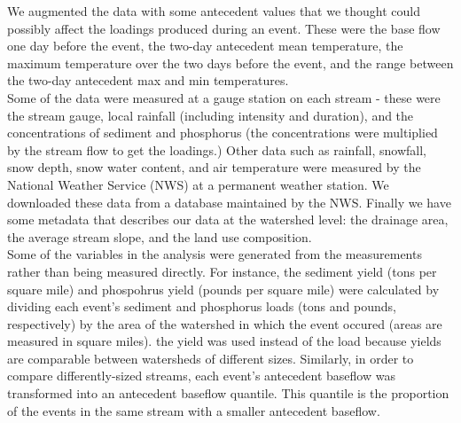 \documentclass[10pt]{article}
\begin{document}
We augmented the data with some antecedent values that we thought could possibly affect the loadings produced during an event. These were the base flow one day before the event, the two-day antecedent mean temperature, the maximum temperature over the two days before the event, and the range between the two-day antecedent max and min temperatures.\\

Some of the data were measured at a gauge station on each stream - these were the stream gauge, local rainfall (including intensity and duration), and the concentrations of sediment and phosphorus (the concentrations were multiplied by the stream flow to get the loadings.) Other data such as rainfall, snowfall, snow depth, snow water content, and air temperature were measured by the National Weather Service (NWS) at a permanent weather station. We downloaded these data from a database maintained by the NWS. Finally we have some metadata that describes our data at the watershed level: the drainage area, the average stream slope, and the land use composition.\\

Some of the variables in the analysis were generated from the measurements rather than being measured directly. For instance, the sediment yield (tons per square mile) and phospohrus yield (pounds per square mile) were calculated by dividing each event's sediment and phosphorus loads (tons and pounds, respectively) by the area of the watershed in which the event occured (areas are measured in square miles). the yield was used instead of the load because yields are comparable between watersheds of different sizes. Similarly, in order to compare differently-sized streams, each event's antecedent baseflow was transformed into an antecedent baseflow quantile. This quantile is the proportion of the events in the same stream with a smaller antecedent baseflow.
\end{document}
